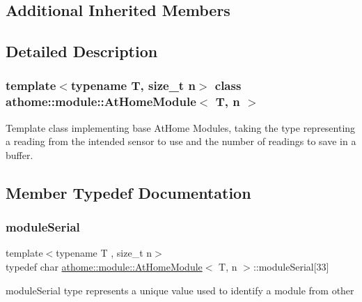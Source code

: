 \subsection*{Additional Inherited Members}


\subsection{Detailed Description}
\subsubsection*{template$<$typename T, size\+\_\+t n$>$\newline
class athome\+::module\+::\+At\+Home\+Module$<$ T, n $>$}

Template class implementing base At\+Home Modules, taking the type representing a reading from the intended sensor to use and the number of readings to save in a buffer. 

\subsection{Member Typedef Documentation}
\mbox{\label{classathome_1_1module_1_1_at_home_module_aff47a5cb8ee94041eb42fa673dea7a81}} 
\subsubsection{\texorpdfstring{module\+Serial}{moduleSerial}}
{\footnotesize\ttfamily template$<$typename T , size\+\_\+t n$>$ \\
typedef char \mbox{\hyperlink{classathome_1_1module_1_1_at_home_module}{athome\+::module\+::\+At\+Home\+Module}}$<$ T, n $>$\+::module\+Serial\mbox{[}33\mbox{]}}

{\ttfamily module\+Serial} type represents a unique value used to identify a module from other \mbox{\label{classathome_1_1module_1_1_at_home_module_a90432f050114b268f7f7e0598dd8c9ac}} 
